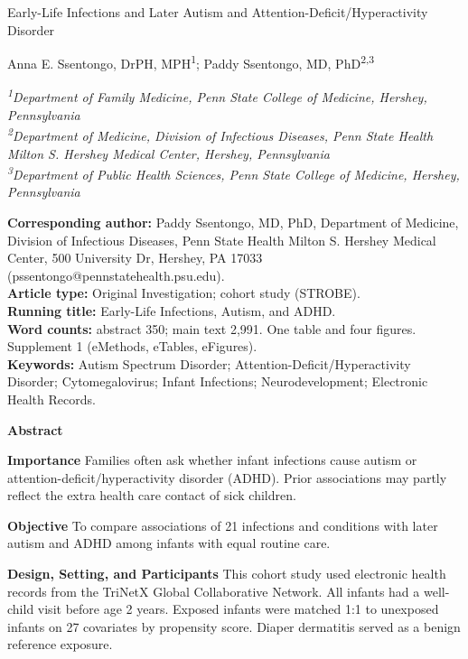 \documentclass[11pt]{article}
\begin{document}
\begin{center}
{\LARGE Early-Life Infections and Later Autism and Attention-Deficit/Hyperactivity Disorder\par}\vspace{1.2em}
{\large Anna E. Ssentongo, DrPH, MPH\textsuperscript{1}; Paddy Ssentongo, MD, PhD\textsuperscript{2,3}\par}\vspace{1em}
{\small\itshape
\textsuperscript{1}Department of Family Medicine, Penn State College of Medicine, Hershey, Pennsylvania\\[0.3em]
\textsuperscript{2}Department of Medicine, Division of Infectious Diseases, Penn State Health Milton S. Hershey Medical Center, Hershey, Pennsylvania\\[0.3em]
\textsuperscript{3}Department of Public Health Sciences, Penn State College of Medicine, Hershey, Pennsylvania\\[0.3em]
}
\end{center}
\vspace{1.5em}
\noindent\textbf{Corresponding author:} Paddy Ssentongo, MD, PhD, Department of Medicine, Division of Infectious Diseases, Penn State Health Milton S. Hershey Medical Center, 500 University Dr, Hershey, PA 17033
(pssentongo@pennstatehealth.psu.edu).\\[0.4em]
\textbf{Article type:} Original Investigation; cohort study (STROBE).\\[0.4em]
\textbf{Running title:} Early-Life Infections, Autism, and ADHD.\\[0.4em]
\textbf{Word counts:} abstract 350; main text 2,991. One table and four figures. Supplement 1 (eMethods, eTables, eFigures).\\[0.4em]
\textbf{Keywords:} Autism Spectrum Disorder; Attention-Deficit/Hyperactivity Disorder; Cytomegalovirus; Infant Infections; Neurodevelopment; Electronic Health Records.

\newpage
\begin{center}\textbf{\large Abstract}\end{center}
\textbf{Importance} Families often ask whether infant infections cause autism or attention-deficit/hyperactivity disorder (ADHD). Prior associations may partly reflect the extra health care contact of
sick children.

\textbf{Objective} To compare associations of 21 infections and conditions with later autism and ADHD among infants with equal routine care.

\textbf{Design, Setting, and Participants} This cohort study used electronic health records from the TriNetX Global Collaborative Network. All infants had a well-child visit before age 2 years.
Exposed infants were matched 1:1 to unexposed infants on 27 covariates by propensity score. Diaper dermatitis served as a benign reference exposure.
\end{document}
